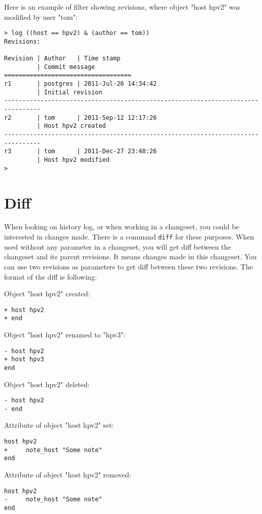 \documentclass[deska]{subfiles}
\begin{document}
Here is an example of filter showing revisions, where object "host hpv2" was modified by user "tom":
\begin{verbatim}
> log ((host == hpv2) & (author == tom))
Revisions:

Revision | Author   | Time stamp                 
         | Commit message
===================================
r1       | postgres | 2011-Jul-26 14:34:42
         | Initial revision
--------------------------------------------------------------------------------
r2       | tom      | 2011-Sep-12 12:17:26
         | Host hpv2 created
--------------------------------------------------------------------------------
r3       | tom      | 2011-Dec-27 23:48:26
         | Host hpv2 modified
> 
\end{verbatim}

\section{Diff}

When looking on history log, or when working in a changeset, you could be interested in changes made. There is a command
{\tt diff} for these purposes. When used without any parameter in a changeset, you will get diff between the changeset and
its parent revisions. It means changes made in this changeset. You can use two revisions as parameters to get diff between
these two revisions. The format of the diff is following:

Object "host hpv2" created:
\begin{verbatim}
+ host hpv2
+ end
\end{verbatim}

Object "host hpv2" renamed to "hpv3":
\begin{verbatim}
- host hpv2
+ host hpv3
end
\end{verbatim}

Object "host hpv2" deleted:
\begin{verbatim}
- host hpv2
- end
\end{verbatim}

Attribute of object "host hpv2" set:
\begin{verbatim}
host hpv2
+     note_host "Some note"
end
\end{verbatim}

Attribute of object "host hpv2" removed:
\begin{verbatim}
host hpv2
-     note_host "Some note"
end
\end{verbatim}
\end{document}
